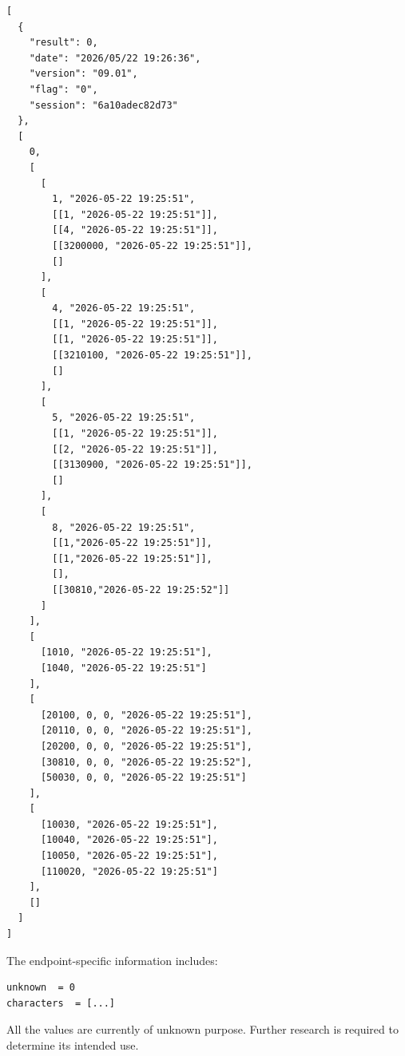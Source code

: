 \begin{lstlisting}
[
  {
    "result": 0,
    "date": "2026/05/22 19:26:36",
    "version": "09.01",
    "flag": "0",
    "session": "6a10adec82d73"
  },
  [
    0,
    [
      [
        1, "2026-05-22 19:25:51",
        [[1, "2026-05-22 19:25:51"]],
        [[4, "2026-05-22 19:25:51"]],
        [[3200000, "2026-05-22 19:25:51"]],
        []
      ],
      [
        4, "2026-05-22 19:25:51",
        [[1, "2026-05-22 19:25:51"]],
        [[1, "2026-05-22 19:25:51"]],
        [[3210100, "2026-05-22 19:25:51"]],
        []
      ],
      [
        5, "2026-05-22 19:25:51",
        [[1, "2026-05-22 19:25:51"]],
        [[2, "2026-05-22 19:25:51"]],
        [[3130900, "2026-05-22 19:25:51"]],
        []
      ],
      [
        8, "2026-05-22 19:25:51",
        [[1,"2026-05-22 19:25:51"]],
        [[1,"2026-05-22 19:25:51"]],
        [],
        [[30810,"2026-05-22 19:25:52"]]
      ]
    ],
    [
      [1010, "2026-05-22 19:25:51"],
      [1040, "2026-05-22 19:25:51"]
    ],
    [
      [20100, 0, 0, "2026-05-22 19:25:51"],
      [20110, 0, 0, "2026-05-22 19:25:51"],
      [20200, 0, 0, "2026-05-22 19:25:51"],
      [30810, 0, 0, "2026-05-22 19:25:52"],
      [50030, 0, 0, "2026-05-22 19:25:51"]
    ],
    [
      [10030, "2026-05-22 19:25:51"],
      [10040, "2026-05-22 19:25:51"],
      [10050, "2026-05-22 19:25:51"],
      [110020, "2026-05-22 19:25:51"]
    ],
    []
  ]
]
\end{lstlisting}

The endpoint-specific information includes:

\begin{lstlisting}
unknown  = 0
characters  = [...]
\end{lstlisting}

\begin{tcolorbox}[colback=yellow!10,colframe=orange!80!black,title=Warning]
All the values are currently of unknown purpose.
Further research is required to determine its intended use.
\end{tcolorbox}

\newpage